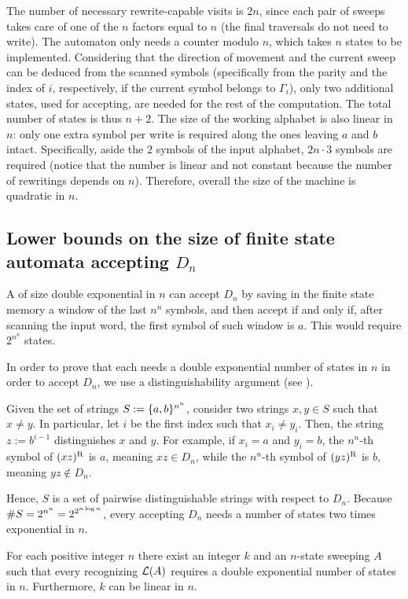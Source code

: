 The number of necessary rewrite-capable visits is $2n$, since each pair of sweeps takes care of one of the $n$ factors equal to $n$ (the final traversals do not need to write).
The automaton only needs a counter modulo $n$, which takes $n$ states to be implemented.
Considering that the direction of movement and the current sweep can be deduced from the scanned symbols (specifically from the parity and the index of $i$, respectively, if the current symbol belongs to $\Gamma_i$), only two additional states, used for accepting, are needed for the rest of the computation.
The total number of states is thus $n+2$.
The size of the working alphabet is also linear in $n$: only one extra symbol per write is required along the ones leaving $a$ and $b$ intact.
Specifically, aside the $2$ symbols of the input alphabet, $2n\cdot3$ symbols are required (notice that the number is linear and not constant because the number of rewritings depends on $n$).
Therefore, overall the size of the machine is quadratic in $n$.

\subsection[Size of finite state automata accepting \texorpdfstring{$D_n$}{Ln}]{Lower bounds on the size of finite state automata accepting $D_n$}
A \ODFA of size double exponential in $n$ can accept $D_n$ by saving in the finite state memory a window of the last $n^n$ symbols, and then accept if and only if, after scanning the input word, the first symbol of such window is $a$.
This would require $2^{n^n}$ states.

In order to prove that each \ODFA needs a double exponential number of states in $n$ in order to accept $D_n$, we use a distinguishability argument (see ).

Given the set of strings $S:=\{a,b\}^{n^n}$, consider two strings $x,y\in S$ such that $x\ne y$.
In particular, let $i$ be the first index such that $x_i\ne y_i$.
Then, the string $z:=b^{i-1}$ distinguishes $x$ and $y$.
For example, if $x_i=a$ and $y_i=b$, the $n^n$-th symbol of $(xz)^{\mathrm R}$ is $a$, meaning $xz\in D_n$, while the $n^n$-th symbol of $(yz)^{\mathrm R}$ is $b$, meaning $yz\notin D_n$.

Hence, $S$ is a set of pairwise distinguishable strings with respect to $D_n$.
Because $\# S=2^{n^n}=2^{2^{n\log n}}$, every \ODFA accepting $D_n$ needs a number of states two times exponential in $n$.

\begin{thrm}
	For each positive integer $n$ there exist an integer $k$ and an $n$-state sweeping \kDLA $A$ such that every \ODFA recognizing $\mathcal L(A)$ requires a double exponential number of states in $n$.
	Furthermore, $k$ can be linear in $n$.
\end{thrm}

